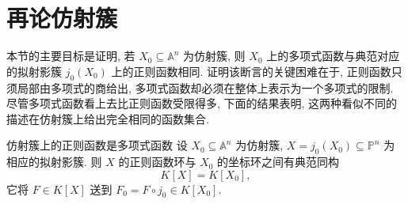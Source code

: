 \section{再论仿射簇}\label{sec:affine-varieties-revisited}

本节的主要目标是证明, 若 $X_{0}\subseteq\mathbb{A}^{n}$ 为仿射簇, 则 $X_{0}$ 上的多项式函数与典范对应的拟射影簇 $j_{0}(X_{0})$ 上的正则函数相同. 证明该断言的关键困难在于, 正则函数只须局部由多项式的商给出, 多项式函数却必须在整体上表示为一个多项式的限制. 尽管多项式函数看上去比正则函数受限得多, 下面的结果表明, 这两种看似不同的描述在仿射簇上给出完全相同的函数集合.

\begin{Theorem}{仿射簇上的正则函数是多项式函数}\leavevmode\label{thm:regular-functions-on-affine-varieties-are-polynomial}
设 $X_{0}\subseteq\mathbb{A}^{n}$ 为仿射簇, $X=j_{0}(X_{0})\subseteq\mathbb{P}^{n}$ 为相应的拟射影簇. 则 $X$ 的正则函数环与 $X_{0}$ 的坐标环之间有典范同构
\[
  K[X]=K[X_{0}],
\]
它将 $F\in K[X]$ 送到 $F_{0}=F\circ j_{0}\in K[X_{0}]$.
\end{Theorem}
